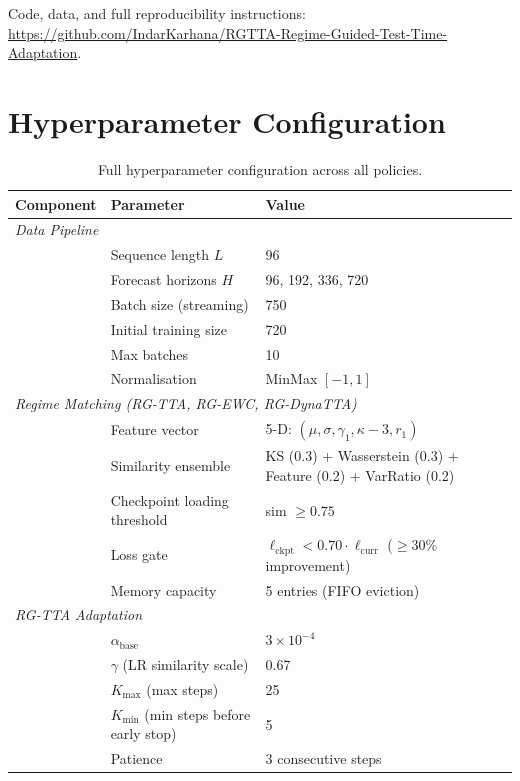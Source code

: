 \documentclass[11pt,a4paper]{article}
\newcommand{\repourl}{\url{https://github.com/IndarKarhana/RGTTA-Regime-Guided-Test-Time-Adaptation}}
\begin{document}
Code, data, and full reproducibility instructions: \repourl.





\appendix

\section{Hyperparameter Configuration}
\label{app:hyperparams}

\begin{table}[t]
\centering
\caption{Full hyperparameter configuration across all policies.}
\label{tab:hyperparams}
\small
\begin{tabular}{lll}
\toprule
Component & Parameter & Value \\
\midrule
\multicolumn{3}{l}{\emph{Data Pipeline}} \\
& Sequence length $L$ & 96 \\
& Forecast horizons $H$ & 96, 192, 336, 720 \\
& Batch size (streaming) & 750 \\
& Initial training size & 720 \\
& Max batches & 10 \\
& Normalisation & MinMax $[-1, 1]$ \\
\midrule
\multicolumn{3}{l}{\emph{Regime Matching (RG-TTA, RG-EWC, RG-DynaTTA)}} \\
& Feature vector & 5-D: $(\mu, \sigma, \gamma_1, \kappa{-}3, r_1)$ \\
& Similarity ensemble & KS (0.3) + Wasserstein (0.3) + Feature (0.2) + VarRatio (0.2) \\
& Checkpoint loading threshold & sim $\geq 0.75$ \\
& Loss gate & $\ell_{\text{ckpt}} < 0.70 \cdot \ell_{\text{curr}}$ ($\geq$30\% improvement) \\
& Memory capacity & 5 entries (FIFO eviction) \\
\midrule
\multicolumn{3}{l}{\emph{RG-TTA Adaptation}} \\
& $\alpha_{\text{base}}$ & $3 \times 10^{-4}$ \\
& $\gamma$ (LR similarity scale) & 0.67 \\
& $K_{\max}$ (max steps) & 25 \\
& $K_{\min}$ (min steps before early stop) & 5 \\
& Patience & 3 consecutive steps \\

\end{tabular}
\end{table}
\end{document}
